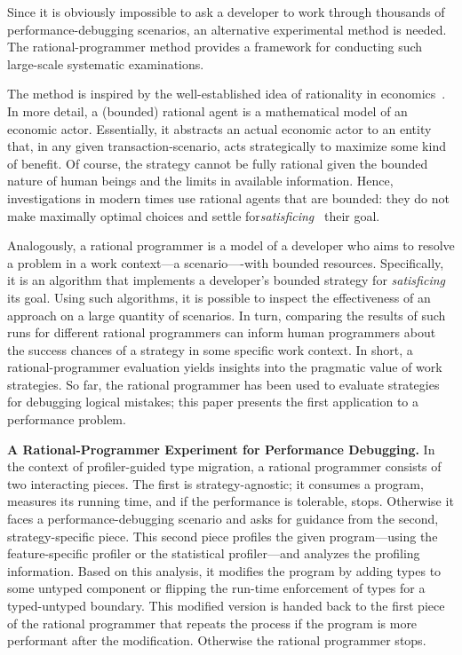 Since it is obviously impossible to ask a developer to work through thousands of
performance-debugging scenarios, an alternative experimental method is needed.
The rational-programmer method provides a framework for conducting such
large-scale systematic examinations.

The method is inspired by the well-established idea of rationality in
economics~\cite{mill1874essays, henrich2001search}.  In more detail, a (bounded)
rational agent is a mathematical model of an economic actor. Essentially, it
abstracts an actual economic actor to an entity that, in any given
transaction-scenario, acts strategically to maximize some kind of benefit.  Of
course, the strategy cannot be fully rational given the bounded nature of human
beings and the limits in available information. Hence, investigations in modern
times use rational agents that are bounded: they do not make maximally optimal
choices and settle for\emph{satisficing}~\cite{hs:satisfice} their goal.

Analogously, a rational programmer is a model of a developer who aims to resolve
a problem in a work context---a scenario----with bounded
resources. Specifically, it is an algorithm that implements a developer's
bounded strategy for \emph{satisficing} its goal. Using such algorithms, it is
possible to inspect the effectiveness of an approach on a large quantity of
scenarios. In turn, comparing the results of such runs for different rational
programmers can inform human programmers about the success chances of a strategy
in some specific work context. In short, a rational-programmer evaluation yields
insights into the pragmatic value of work strategies. So far, the rational
programmer has been used to evaluate strategies for debugging logical mistakes;
this paper presents the first application to a performance problem. 

\medskip

\noindent\textbf{A Rational-Programmer Experiment for Performance Debugging.}
In the context of profiler-guided type migration, a rational programmer consists
of two interacting pieces.  The first is strategy-agnostic; it consumes a
program, measures its running time, and if the performance is tolerable,
stops. Otherwise it faces a performance-debugging scenario and asks for guidance
from the second, strategy-specific piece. This second piece profiles the given
program---using the feature-specific profiler or the statistical profiler---and
analyzes the profiling information. Based on this analysis, it modifies the
program by adding types to some untyped component or flipping the run-time
enforcement of types for a typed-untyped boundary. This modified version is
handed back to the first piece of the rational programmer that repeats the
process if the program is more performant after the modification.
Otherwise the rational programmer stops. 

